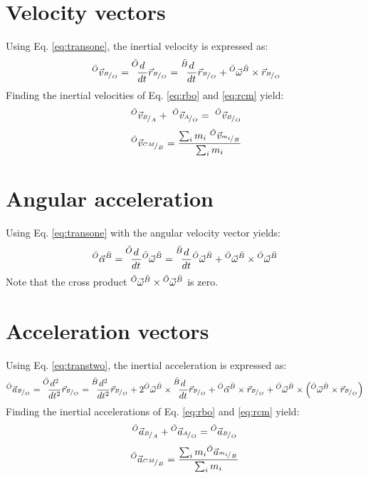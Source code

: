 \documentclass{article}
\begin{document}
\section{Velocity vectors}
\label{sec:vel}
Using Eq. \ref{eq:transone}, the inertial velocity is expressed as:
\begin{equation}
    \VelVec{O}{B}{O} = \TransOne{O}{B}{\PosVec{B}{O}}
\end{equation}
Finding the inertial velocities of Eq. \ref{eq:rbo} and \ref{eq:rcm} yield:
\begin{equation}
    \,\,^{\bar{O}}{\vec{v}}_{{}^{B}\!/_{A}} + \,\,^{\bar{O}}{\vec{v}}_{{}^{A}\!/_{O}} = \,\,^{\bar{O}}{\vec{v}}_{{}^{B}\!/_{O}}
    \label{eq:ovbo}
\end{equation}
\begin{equation}
    \,\,^{\bar{O}}{\vec{v}}_{{}^{CM}\!/_{B}} = \frac{\sum_{i} m_i\,\,^{\bar{O}}{\vec{v}}_{{}^{m_i}\!/_{B}}}{\sum_{i} m_i} 
    \label{eq:ovcmb}
\end{equation}




\section{Angular acceleration}
\label{sec:angaccl}
Using Eq. \ref{eq:transone} with the angular velocity vector yields:
\begin{equation}
    \AngAccl{O}{B} = \TransOne{O}{B}{\AngVel{O}{B}}
    \label{eq:angaccl}
\end{equation}
Note that the cross product $\,\,\!\!^{\bar{O}}\vec{\omega}^{\bar{B}}\times\,\,\!\!^{\bar{O}}\vec{\omega}^{\bar{B}}$ is zero. 




\section{Acceleration vectors}
\label{sec:accl}
Using Eq. \ref{eq:transtwo}, the inertial acceleration is expressed as:
\begin{equation}
    \AcclVec{O}{B}{O} = \TransTwo{O}{B}{\PosVec{B}{O}}
\end{equation}
Finding the inertial accelerations of Eq. \ref{eq:rbo} and \ref{eq:rcm} yield:
\begin{equation}
     {}^{\bar{O}}{\vec{a}}_{{}^{B}\!/_{A}} +  {}^{\bar{O}}{\vec{a}}_{{}^{A}\!/_{O}} =  {}^{\bar{O}}{\vec{a}}_{{}^{B}\!/_{O}}
    \label{eq:oabo}
\end{equation}
\begin{equation}
     {}^{\bar{O}}{\vec{a}}_{{}^{CM}\!/_{B}} = \frac{\sum_{i} m_i {}^{\bar{O}}{\vec{a}}_{{}^{m_i}\!/_{B}}}{\sum_{i} m_i} 
    \label{eq:oacmb}
\end{equation}
\end{document}
